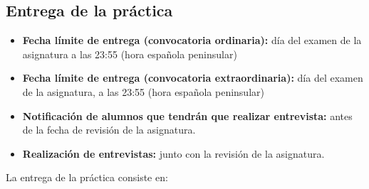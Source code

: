\subsection{Entrega de la práctica}

\begin{itemize}
  \item \textbf{Fecha límite de entrega (convocatoria ordinaria):} día del examen de la asignatura a las 23:55 (hora española peninsular)
  \item \textbf{Fecha límite de entrega (convocatoria extraordinaria):} día del examen de la asignatura, a las 23:55 (hora española peninsular)
  \item \textbf{Notificación de alumnos que tendrán que realizar entrevista:} antes de la fecha de revisión de la asignatura.
  \item \textbf{Realización de entrevistas:} junto con la revisión de la asignatura.    

\end{itemize}

La entrega de la práctica consiste en:

